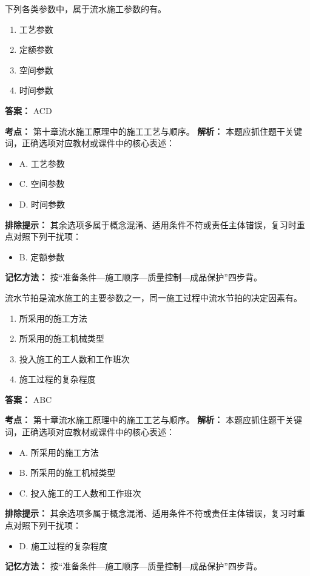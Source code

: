 \documentclass[UTF8,fontset=fandol,11pt]{ctexart}
\begin{document}
\begin{quizbox}[title={第 22 题}]
下列各类参数中，属于流水施工参数的有。\\
\begin{enumerate}[label=\Alph*.]
\item 工艺参数
\item 定额参数
\item 空间参数
\item 时间参数
\end{enumerate}
\textbf{答案：} ACD
\vspace{0.25em}
\begin{answerbox}[title={考点解析}]
\textbf{考点：} 第十章流水施工原理中的施工工艺与顺序。
\textbf{解析：} 本题应抓住题干关键词，正确选项对应教材或课件中的核心表述：
\begin{itemize}
\item A. 工艺参数
\item C. 空间参数
\item D. 时间参数
\end{itemize}
\textbf{排除提示：} 其余选项多属于概念混淆、适用条件不符或责任主体错误，复习时重点对照下列干扰项：
\begin{itemize}
\item B. 定额参数
\end{itemize}
\textbf{记忆方法：} 按“准备条件—施工顺序—质量控制—成品保护”四步背。
\end{answerbox}
\end{quizbox}

\vspace{0.2em}

\begin{quizbox}[title={第 23 题}]
流水节拍是流水施工的主要参数之一，同一施工过程中流水节拍的决定因素有。\\
\begin{enumerate}[label=\Alph*.]
\item 所采用的施工方法
\item 所采用的施工机械类型
\item 投入施工的工人数和工作班次
\item 施工过程的复杂程度
\end{enumerate}
\textbf{答案：} ABC
\vspace{0.25em}
\begin{answerbox}[title={考点解析}]
\textbf{考点：} 第十章流水施工原理中的施工工艺与顺序。
\textbf{解析：} 本题应抓住题干关键词，正确选项对应教材或课件中的核心表述：
\begin{itemize}
\item A. 所采用的施工方法
\item B. 所采用的施工机械类型
\item C. 投入施工的工人数和工作班次
\end{itemize}
\textbf{排除提示：} 其余选项多属于概念混淆、适用条件不符或责任主体错误，复习时重点对照下列干扰项：
\begin{itemize}
\item D. 施工过程的复杂程度
\end{itemize}
\textbf{记忆方法：} 按“准备条件—施工顺序—质量控制—成品保护”四步背。
\end{answerbox}
\end{quizbox}
\end{document}

